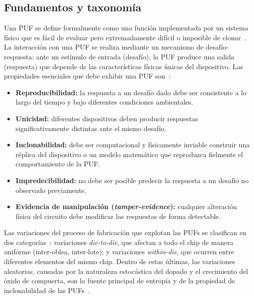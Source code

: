 \subsection{Fundamentos y taxonomía}
\label{sec:puf_fund}

Una PUF se define formalmente como una función implementada por un sistema
físico que es fácil de evaluar pero extremadamente difícil o imposible de
clonar~\cite{anandakumar_2021_fpgapufs}. La interacción con una PUF se
realiza mediante un mecanismo de desafío-respuesta: ante un estímulo de
entrada (desafío), la PUF produce una salida (respuesta) que depende de las
características físicas únicas del dispositivo. Las propiedades esenciales que
debe exhibir una PUF son~\cite{lata_2023_fpgapuf, anandakumar_2021_fpgapufs}:

\begin{itemize}
  \item \textbf{Reproducibilidad:} la respuesta a un desafío dado debe ser
    consistente a lo largo del tiempo y bajo diferentes condiciones
    ambientales.
  \item \textbf{Unicidad:} diferentes dispositivos deben producir respuestas
    significativamente distintas ante el mismo desafío.
  \item \textbf{Inclonabilidad:} debe ser computacional y físicamente
    inviable construir una réplica del dispositivo o un modelo matemático que
    reproduzca fielmente el comportamiento de la PUF.
  \item \textbf{Impredecibilidad:} no debe ser posible predecir la respuesta
    a un desafío no observado previamente.
  \item \textbf{Evidencia de manipulación (\textit{tamper-evidence}):}
    cualquier alteración física del circuito debe modificar las respuestas de
    forma detectable.
\end{itemize}

Las variaciones del proceso de fabricación que explotan las PUFs se
clasifican en dos categorías~\cite{anandakumar_2021_fpgapufs}: variaciones
\textit{die-to-die}, que afectan a todo el chip de manera uniforme (inter-oblea,
inter-lote); y variaciones \textit{within-die}, que ocurren entre diferentes
elementos del mismo chip. Dentro de estas últimas, las variaciones aleatorias, causadas por la naturaleza estocástica del dopado y el crecimiento del óxido
de compuerta, son la fuente principal de entropía y de la propiedad de
inclonabilidad de las PUFs~\cite{anandakumar_2021_fpgapufs,
sudhanya_2016_silicon}.

